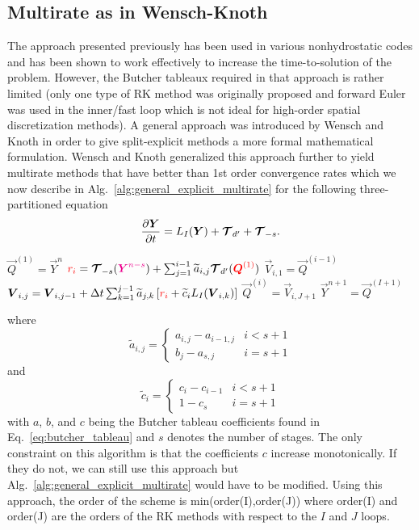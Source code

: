 \documentclass{report}
\numberwithin{equation}{section}
\begin{document}
\subsection{Multirate as in Wensch-Knoth}
The approach presented previously has been used in various nonhydrostatic codes and has been shown to work effectively to increase the time-to-solution of the problem.  However, the Butcher tableaux required in that approach is rather limited (only one type of RK method was originally proposed and forward Euler was used in the inner/fast loop which is not ideal for high-order spatial discretization methods).  A general approach was introduced by Wensch and Knoth in order to give split-explicit methods a more formal mathematical formulation.  Wensch and Knoth generalized this approach further to yield multirate methods that have better than 1st order convergence rates which we now describe in Alg.\ \ref{alg:general_explicit_multirate} for the following three-partitioned equation
\[
\frac{\partial \boldsymbol{{Y}}}{\partial t}= L_I(\boldsymbol{{Y}}) +  \boldsymbol{{\mathcal{T}}}_{d'} + \boldsymbol{{\mathcal{T}}}_{-s}.
\]
\begin{algorithm}
\label{alg:general_explicit_multirate}
\begin{algorithmic}
\State
{}
\State $\vec{Q}^{(1)}=\vec{Y}^n$ 
\State $\textcolor{red}{r_i}=\boldsymbol{{\mathcal{T}}}_{-s}(\textcolor{magenta}{ \boldsymbol{{Y}}^{n-s}}) + \sum_{j=1}^{i-1} \widetilde{a}_{i,j} \boldsymbol{{\mathcal{T}}}_{d'}(\textcolor{red}{\boldsymbol{{Q}}^{(1)}})$
\State $\vec{V}_{i,1}=\vec{Q}^{(i-1)}$
\State $\boldsymbol{{V}}_{i,j}=\boldsymbol{{V}}_{i,j-1} + \Delta t \sum_{k=1}^{j-1} \widetilde{a}_{j,k} \left[ \textcolor{red}{r_i} + \widetilde{c}_{i} L_I(\boldsymbol{{V}}_{i,k}) \right]$ 
\EndFor %
\State $\vec{Q}^{(i)}=\vec{V}_{i,J+1}$
\EndFor %
\State $\vec{Y}^{n+1}=\vec{Q}^{(I+1)}$
\EndFunction
\end{algorithmic}
\end{algorithm}
where 
\[
\widetilde{a}_{i,j}=\left\{
\begin{array}{cc}
  {a}_{i,j}-{a}_{i-1,j}   &  i < s+1 \\
  {b}_{j}-{a}_{s,j}   &  i = s+1  
\end{array}
\right.
\]
and
\[
\widetilde{c}_{i}=\left\{
\begin{array}{cc}
  {c}_{i}-{c}_{i-1}   &  i < s+1 \\
  1-{c}_{s}   &  i = s+1  
\end{array}
\right.
\]
with $a$, $b$, and $c$ being the Butcher tableau coefficients found in Eq.\ \eqref{eq:butcher_tableau} and $s$ denotes the number of stages.  The only constraint on this algorithm is that the coefficients $c$ increase monotonically. If they do not, we can still use this approach but Alg.\ \ref{alg:general_explicit_multirate} would have to be modified.  Using this approach, the order of the scheme is min(order(I),order(J)) where  order(I) and order(J) are the orders of the RK methods with respect to the $I$ and $J$ loops.
\end{document}
